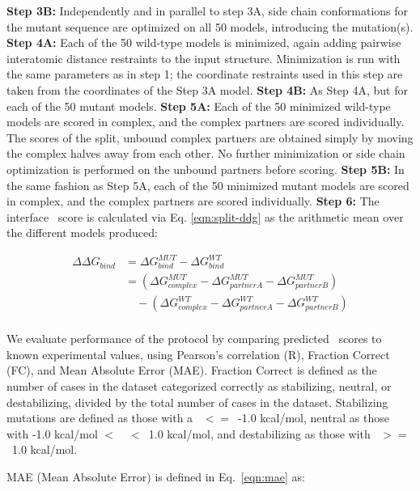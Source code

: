 \textbf{Step 3B:} Independently and in parallel to step 3A, side chain conformations for the mutant sequence are optimized on all 50 models, introducing the mutation(s).
\textbf{Step 4A:} Each of the 50 wild-type models is minimized, again adding pairwise interatomic distance restraints to the input structure. Minimization is run with the same parameters as in step 1; the coordinate restraints used in this step are taken from the coordinates of the Step 3A model.
\textbf{Step 4B:} As Step 4A, but for each of the 50 mutant models.
\textbf{Step 5A:} Each of the 50 minimized wild-type models are scored in complex, and the complex partners are scored individually. The scores of the split, unbound complex partners are obtained simply by moving the complex halves away from each other. No further minimization or side chain optimization is performed on the unbound partners before scoring.
\textbf{Step 5B:} In the same fashion as Step 5A, each of the 50 minimized mutant models are scored in complex, and the complex partners are scored individually.
\textbf{Step 6:} The interface \ddg\ score is calculated via Eq. \ref{eqn:split-ddg} as the arithmetic mean over the different models produced:

\begin{equation}\label{eqn:split-ddg}
  \begin{split}
    {\Delta\Delta}G_{bind} & ={\Delta}G^{MUT}_{bind} - {\Delta}G^{WT}_{bind}\\
    & =({\Delta}G^{MUT}_{complex} - {\Delta}G^{MUT}_{partner A} - {\Delta}G^{MUT}_{partner B})\\
    & \quad - ({\Delta}G^{WT}_{complex} - {\Delta}G^{WT}_{partner A} - {\Delta}G^{WT}_{partner B})\\
  \end{split}
\end{equation}

We evaluate performance of the protocol by comparing predicted \ddg\ scores to known experimental values, using Pearson's correlation (R), Fraction Correct (FC), and Mean Absolute Error (MAE). Fraction Correct is defined as the number of cases in the dataset categorized correctly as stabilizing, neutral, or destabilizing, divided by the total number of cases in the dataset. Stabilizing mutations are defined as those with a \ddg\ $<=$\ -1.0 kcal/mol, neutral as those with -1.0 kcal/mol $<$\ \ddg\ $<$\ 1.0 kcal/mol, and destabilizing as those with \ddg\ $>=$\ 1.0 kcal/mol.

MAE (Mean Absolute Error) is defined in Eq.~\ref{eqn:mae} as:

